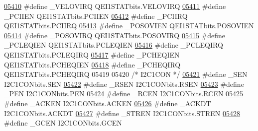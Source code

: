 \begin{DoxyCode}
\hypertarget{a00015_source_l05410}{}\hyperlink{a00015_aeb9bc6491432ee1e066b12009b0fd255}{05410} \textcolor{preprocessor}{#define \_VELOVIRQ QEI1STATbits.VELOVIRQ}
\hypertarget{a00015_source_l05411}{}\hyperlink{a00015_a4fe3054e92d232dfe794253854ab21ec}{05411} \textcolor{preprocessor}{#define \_PCIIEN QEI1STATbits.PCIIEN}
\hypertarget{a00015_source_l05412}{}\hyperlink{a00015_a4c6c19fc3593b90b08070048eb05e31d}{05412} \textcolor{preprocessor}{#define \_PCIIRQ QEI1STATbits.PCIIRQ}
\hypertarget{a00015_source_l05413}{}\hyperlink{a00015_af40c39003bb40617c7980f76b4650430}{05413} \textcolor{preprocessor}{#define \_POSOVIEN QEI1STATbits.POSOVIEN}
\hypertarget{a00015_source_l05414}{}\hyperlink{a00015_a3eefc661a5536e7cdf62e20cd67eabed}{05414} \textcolor{preprocessor}{#define \_POSOVIRQ QEI1STATbits.POSOVIRQ}
\hypertarget{a00015_source_l05415}{}\hyperlink{a00015_ac62809cbe23c43fea85cabc7f77df256}{05415} \textcolor{preprocessor}{#define \_PCLEQIEN QEI1STATbits.PCLEQIEN}
\hypertarget{a00015_source_l05416}{}\hyperlink{a00015_aac259c75f57be462370a00762be9a247}{05416} \textcolor{preprocessor}{#define \_PCLEQIRQ QEI1STATbits.PCLEQIRQ}
\hypertarget{a00015_source_l05417}{}\hyperlink{a00015_aa1093c63c618c18559a6fb7067e72b0b}{05417} \textcolor{preprocessor}{#define \_PCHEQIEN QEI1STATbits.PCHEQIEN}
\hypertarget{a00015_source_l05418}{}\hyperlink{a00015_a71308add8fdcf0f1e1aa903d2574e374}{05418} \textcolor{preprocessor}{#define \_PCHEQIRQ QEI1STATbits.PCHEQIRQ}
05419 
05420 \textcolor{comment}{/* I2C1CON */}
\hypertarget{a00015_source_l05421}{}\hyperlink{a00015_a7c8ad43f77a5137f25db0583d0e21234}{05421} \textcolor{preprocessor}{#define \_SEN I2C1CONbits.SEN}
\hypertarget{a00015_source_l05422}{}\hyperlink{a00015_a911499455fea3d5248d9c22272ae88bc}{05422} \textcolor{preprocessor}{#define \_RSEN I2C1CONbits.RSEN}
\hypertarget{a00015_source_l05423}{}\hyperlink{a00015_aac2c59308ce8a4741bf5dd5298c62d3c}{05423} \textcolor{preprocessor}{#define \_PEN I2C1CONbits.PEN}
\hypertarget{a00015_source_l05424}{}\hyperlink{a00015_a8ece677ceb54047355b0bc18114ac4ef}{05424} \textcolor{preprocessor}{#define \_RCEN I2C1CONbits.RCEN}
\hypertarget{a00015_source_l05425}{}\hyperlink{a00015_a547291ece86d3c8d88a0af37d8bbdf21}{05425} \textcolor{preprocessor}{#define \_ACKEN I2C1CONbits.ACKEN}
\hypertarget{a00015_source_l05426}{}\hyperlink{a00015_aa9a28d6a5f613a9b9603b642ad2e599c}{05426} \textcolor{preprocessor}{#define \_ACKDT I2C1CONbits.ACKDT}
\hypertarget{a00015_source_l05427}{}\hyperlink{a00015_aeb20ac5a21f1d2c922b46997cff1109d}{05427} \textcolor{preprocessor}{#define \_STREN I2C1CONbits.STREN}
\hypertarget{a00015_source_l05428}{}\hyperlink{a00015_a931dddd3d08901bf6dded5ccf4b20ccb}{05428} \textcolor{preprocessor}{#define \_GCEN I2C1CONbits.GCEN}

\end{DoxyCode}
